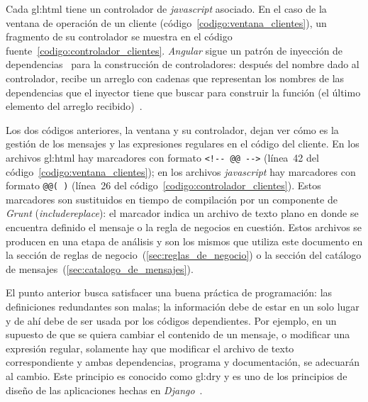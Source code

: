 
Cada \gls{gl:html} tiene un controlador de \textit{javascript} asociado. En el
caso de la ventana de operación de un cliente
(código~\ref{codigo:ventana_clientes}), un fragmento de su controlador se
muestra en el código fuente~\ref{codigo:controlador_clientes}. \textit{Angular}
sigue un patrón de inyección de dependencias~\cite{inyeccion_de_dependencias}
para la construcción de controladores: después del nombre dado al controlador,
recibe un arreglo con cadenas que representan los nombres de las dependencias
que el inyector tiene que buscar para construir la función (el último elemento
del arreglo recibido)~\cite{angular_inyector}.



Los dos códigos anteriores, la ventana y su controlador, dejan ver cómo es la
gestión de los mensajes y las expresiones regulares en el código del cliente.
En los archivos \gls{gl:html} hay marcadores con formato \verb|<!-- @@ -->|
(línea~42 del código~\ref{codigo:ventana_clientes}); en los archivos
\textit{javascript} hay marcadores con formato \verb|@@( )| (línea~26 del
código~\ref{codigo:controlador_clientes}). Estos marcadores son sustituidos en
tiempo de compilación por un componente de \textit{Grunt}
(\textit{includereplace}): el marcador indica un archivo de texto plano en
donde se encuentra definido el mensaje o la regla de negocios en cuestión. Estos
archivos se producen en una etapa de análisis y son los mismos que utiliza este
documento en la sección de reglas de negocio~(\ref{sec:reglas_de_negocio}) o la
sección del catálogo de mensajes~(\ref{sec:catalogo_de_mensajes}).

El punto anterior busca satisfacer una buena práctica de programación: las
definiciones redundantes son malas; la información debe de estar en un solo
lugar y de ahí debe de ser usada por los códigos dependientes. Por ejemplo,
en un supuesto de que se quiera cambiar el contenido de un mensaje, o modificar
una expresión regular, solamente hay que modificar el archivo de texto
correspondiente y ambas dependencias, programa y documentación, se adecuarán
al cambio. Este principio es conocido como \gls{gl:dry} y es uno de los
principios de diseño de las aplicaciones hechas en
\textit{Django}~\cite{django_principios_de_disenio}.

